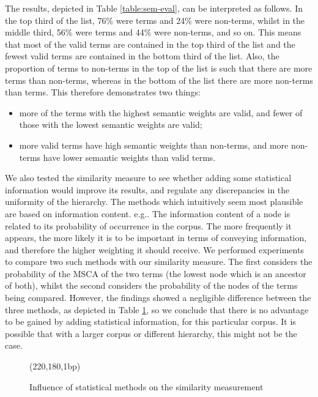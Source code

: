  The results, depicted in Table \ref{table:sem-eval}, can be interpreted
as follows. In the
top third of the list, 76\% were terms and 24\% were non-terms, whilst
in the middle third, 56\% were terms and 44\% were non-terms, and so
on. This means that most of
the valid terms are contained in the top third of the list and the
fewest valid terms are contained in the bottom third of the
list. Also, the proportion of terms to non-terms in the top of the
list is such that there are more terms than non-terms, whereas in the
bottom of the list there are more non-terms than terms. This therefore
demonstrates two things:
\begin{itemize}
\item more of the terms with the highest semantic weights are
valid, and fewer of those with the lowest semantic weights are valid; 
\item more valid terms have high semantic weights than non-terms,
and more non-terms have lower semantic weights than valid terms.
\end{itemize}

We also tested the similarity measure to see whether adding some
statistical information would improve its results, and regulate any
discrepancies in the uniformity of the hierarchy. The methods which
intuitively seem most plausible are based on information
content. e.g.\cite{Resnik95,Smeaton96}. The
information content of a node is related to its probability of
occurrence in the corpus. The more frequently it appears, the more
likely it is to be important in terms of conveying information, and
therefore the higher weighting it should receive. We performed experiments to compare two such methods with our similarity
measure. The first considers the probability of the MSCA of the two
terms (the lowest node which is an ancestor of both), whilst the second considers the probability of the nodes of the
terms being compared. However, the findings showed a negligible
difference between the three methods, as depicted in Table
\ref{fig:icsim}, so we conclude that there is no advantage to be
gained by adding statistical information, for this particular
corpus. It is possible that with a larger corpus or different
hierarchy, this might not be the case.

\begin{figure}
\begin{center}
\begin{epsf}
\end{epsf}
\begin{draft}
\atari(220,180,1bp)
\end{draft}
\end{center}
\caption{Influence of statistical methods on the similarity measurement}
\label{fig:icsim}
\end{figure}

